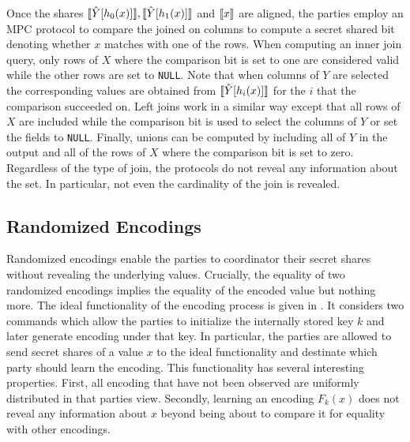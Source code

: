 Once the shares  $\llbracket \hat Y[{h_0(x)}]\rrbracket, \llbracket \hat Y[{h_1(x)}]\rrbracket$ and $\llbracket x\rrbracket$ are aligned, the parties employ an MPC protocol to compare the joined on columns to compute a secret shared bit denoting whether $x$ matches with one of the rows. When computing an inner join query, only rows of $X$ where the comparison bit is set to one are considered valid while the other rows are set to \texttt{NULL}. Note that when columns of $Y$ are selected the corresponding values are obtained from $\llbracket \hat Y[{h_i(x)}]\rrbracket$ for the $i$ that the comparison succeeded on. Left joins work in a similar way except that all rows of $X$ are included while the comparison bit is used to select the columns of $Y$ or set the fields to \texttt{NULL}. Finally, unions can be computed by including all of $Y$ in the output and all of the rows of $X$ where the comparison bit is set to zero. Regardless of the type of join, the protocols do not reveal any information about the set. In particular, not even the cardinality of the join is revealed.

\subsection{Randomized Encodings}

Randomized encodings enable the parties to coordinator their secret shares without revealing the underlying values. Crucially, the equality  of two randomized encodings implies the equality of the encoded value but nothing more. The ideal functionality of the encoding process is given in . It considers two commands which allow the parties to initialize the internally stored key $k$ and later generate encoding under that key. In particular, the parties are allowed to send secret shares of a value $x$  to the ideal functionality and destinate which party should learn the encoding. This functionality has several interesting properties. First, all encoding that have not been observed are uniformly distributed in that parties view. Secondly, learning an encoding $F_k(x)$ does not reveal any information about $x$ beyond being about to compare it for equality with other encodings. 

